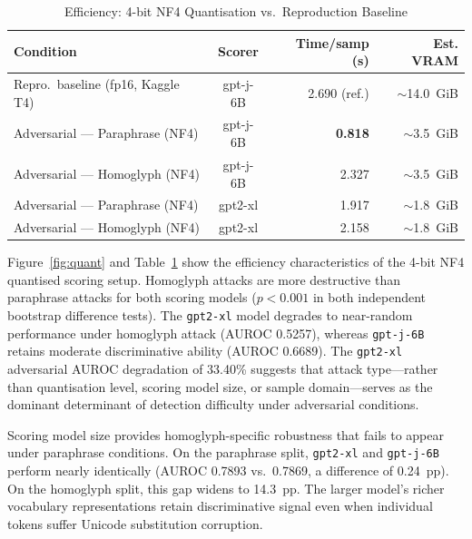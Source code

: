 \documentclass[conference]{IEEEtran}
\begin{document}
\begin{table}[t]
\caption{Efficiency: 4-bit NF4 Quantisation vs.\ Reproduction Baseline}
\label{tab:efficiency}
\begin{center}
\small
\begin{tabular}{lcrr}
\toprule
\textbf{Condition} & \textbf{Scorer} & \textbf{Time/samp (s)} & \textbf{Est. VRAM}\\
\midrule
Repro.\ baseline (fp16, Kaggle T4) & gpt-j-6B & 2.690 (ref.)  & $\sim$14.0~GiB\\
Adversarial --- Paraphrase (NF4)   & gpt-j-6B & \textbf{0.818} & $\sim$3.5~GiB\\
Adversarial --- Homoglyph (NF4)    & gpt-j-6B & 2.327          & $\sim$3.5~GiB\\
Adversarial --- Paraphrase (NF4)   & gpt2-xl  & 1.917          & $\sim$1.8~GiB\\
Adversarial --- Homoglyph (NF4)    & gpt2-xl  & 2.158          & $\sim$1.8~GiB\\
\bottomrule
\end{tabular}
\end{center}
\end{table}

Figure~\ref{fig:quant} and Table~\ref{tab:efficiency} show the efficiency
characteristics of the 4-bit NF4 quantised scoring setup.
Homoglyph attacks are more destructive than paraphrase
attacks for both scoring models ($p < 0.001$ in both independent
bootstrap difference tests). The \texttt{gpt2-xl} model degrades to
near-random performance under homoglyph attack (AUROC 0.5257), whereas
\texttt{gpt-j-6B} retains moderate discriminative ability (AUROC 0.6689).
The \texttt{gpt2-xl} adversarial AUROC degradation of 33.40\% suggests that attack type---rather
than quantisation level, scoring model size, or sample domain---serves as
the dominant determinant of detection difficulty under adversarial conditions.

Scoring model size provides homoglyph-specific robustness that fails to
appear under paraphrase conditions. On the paraphrase split, \texttt{gpt2-xl}
and \texttt{gpt-j-6B} perform nearly identically (AUROC 0.7893 vs.\ 0.7869,
a difference of 0.24~pp). On the homoglyph split, this gap widens to 14.3~pp.
The larger model's richer vocabulary representations retain discriminative
signal even when individual tokens suffer Unicode substitution corruption.
\end{document}

